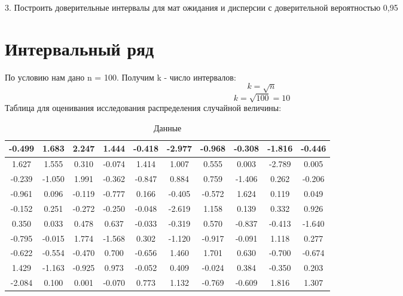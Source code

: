 \documentclass{article}
\begin{document}
3. Построить доверительные интервалы для мат ожидания и дисперсии с доверительной вероятностью 0,95

\section{Интервальный ряд}
По условию нам дано n = 100. Получим k - число интервалов:
\begin{equation}
    k = \sqrt{n}
\end{equation}
\begin{equation*}
    k = \sqrt{100} = 10
\end{equation*}
Таблица для оценивания исследования распределения случайной величины:
\begin{table}[h]
    \centering
    \begin{tabular}{|*{10}{c|}}
        \hline
        -0.499 & 1.683 & 2.247 & 1.444 & -0.418 & -2.977 & -0.968 & -0.308 & -1.816 & -0.446 \\
        \hline
        1.627 & 1.555 & 0.310 & -0.074 & 1.414 & 1.007 & 0.555 & 0.003 & -2.789 & 0.005 \\
        \hline
        -0.239 & -1.050 & 1.991 & -0.362 & -0.847 & 0.884 & 0.759 & -1.406 & 0.262 & -0.206 \\
        \hline
        -0.961 & 0.096 & -0.119 & -0.777 & 0.166 & -0.405 & -0.572 & 1.624 & 0.119 & 0.049 \\
        \hline
        -0.152 & 0.251 & -0.272 & -0.250 & -0.048 & -2.619 & 1.158 & 0.139 & 0.332 & 0.926 \\
        \hline
        0.350 & 0.033 & 0.478 & 0.637 & -0.033 & -0.319 & 0.570 & -0.837 & -0.413 & -1.640 \\
        \hline
        -0.795 & -0.015 & 1.774 & -1.568 & 0.302 & -1.120 & -0.917 & -0.091 & 1.118 & 0.277 \\
        \hline
        -0.622 & -0.554 & -0.470 & 0.700 & -0.656 & 1.460 & 1.701 & 0.630 & -0.700 & -0.674 \\
        \hline
        1.429 & -1.163 & -0.925 & 0.973 & -0.052 & 0.409 & -0.024 & 0.384 & -0.350 & 0.203 \\
        \hline
        -2.084 & 0.100 & 0.001 & -0.070 & 0.773 & 1.132 & -0.769 & -0.609 & 1.816 & 1.307 \\
        \hline
    \end{tabular}
    \caption{Данные}
\end{table}
\\
\end{document}
